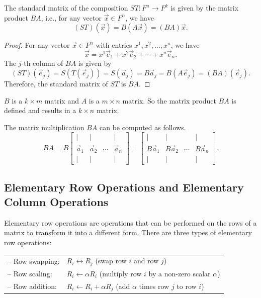 \begin{proposition}
  The standard matrix of the composition $ST \colon F^n \to F^k$ is given by the matrix product $BA$, i.e., for any vector $\vec{x} \in F^n$, we have
  \[ (ST)(\vec{x}) = B (A \vec{x}) = (BA) \vec{x}. \]
\end{proposition}
\begin{proof}
  For any vector $\vec{x} \in F^n$ with entries $x^1, x^2, \ldots, x^n$, we have
  \[ \vec{x} = x^1 \vec{e}_1 + x^2 \vec{e}_2 + \cdots + x^n \vec{e}_n. \]
  The $j$-th column of $BA$ is given by
  \[ (ST)(\vec{e}_j) = S(T(\vec{e}_j)) = S(\vec{a}_j) = B \vec{a}_j = B (A \vec{e}_j) = (BA)(\vec{e}_j). \]
  Therefore, the standard matrix of $ST$ is $BA$.
\end{proof}

\begin{remark}
  $B$ is a $k \times m$ matrix and $A$ is a $m \times n$ matrix. So the matrix product $BA$ is defined and results in a $k \times n$ matrix.
\end{remark}

The matrix multiplication $BA$ can be computed as follows.
\[
  BA = B \begin{bmatrix}
    |         & |         &        & |         \\
    \vec{a}_1 & \vec{a}_2 & \cdots & \vec{a}_n \\
    |         & |         &        & |
  \end{bmatrix} = \begin{bmatrix}
    |           & |           &        & |           \\
    B \vec{a}_1 & B \vec{a}_2 & \cdots & B \vec{a}_n \\
    |           & |           &        & |
  \end{bmatrix}.
\]

\subsection{Elementary Row Operations and Elementary Column Operations}

Elementary row operations are operations that can be performed on the rows of a matrix to transform it into a different form. There are three types of elementary row operations:

\begin{tabularx}{\textwidth}{lX}
  -- Row swapping: & $R_i \leftrightarrow R_j$ (swap row $i$ and row $j$)                         \\
  -- Row scaling:  & $R_i \leftarrow \alpha R_i$ (multiply row $i$ by a non-zero scalar $\alpha$) \\
  -- Row addition: & $R_i \leftarrow R_i + \alpha R_j$ (add $\alpha$ times row $j$ to row $i$)
\end{tabularx}

